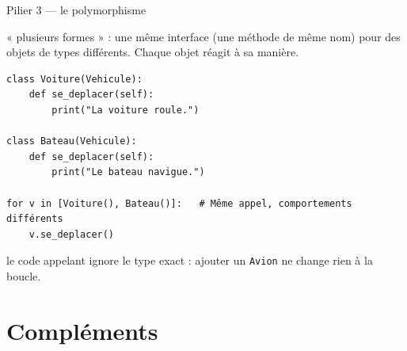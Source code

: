 \documentclass[11pt,aspectratio=169]{beamer}
\newcommand{\py}[1]{\texttt{#1}}
\begin{document}
\begin{frame}[fragile,shrink=5]{Pilier 3 --- le polymorphisme}
  \begin{defi}[Polymorphisme]
    « plusieurs formes » : une même interface (une méthode de même nom) pour des
    objets de types différents. Chaque objet réagit à sa manière.
  \end{defi}
\begin{lstlisting}
class Voiture(Vehicule):
    def se_deplacer(self):
        print("La voiture roule.")

class Bateau(Vehicule):
    def se_deplacer(self):
        print("Le bateau navigue.")

for v in [Voiture(), Bateau()]:   # Même appel, comportements différents
    v.se_deplacer()
\end{lstlisting}
  \vspace{-2mm}
  \begin{methode}[Intérêt]
    le code appelant ignore le type exact : ajouter un \py{Avion} ne change
    rien à la boucle.
  \end{methode}
\end{frame}

\section{Compléments}
\end{document}
